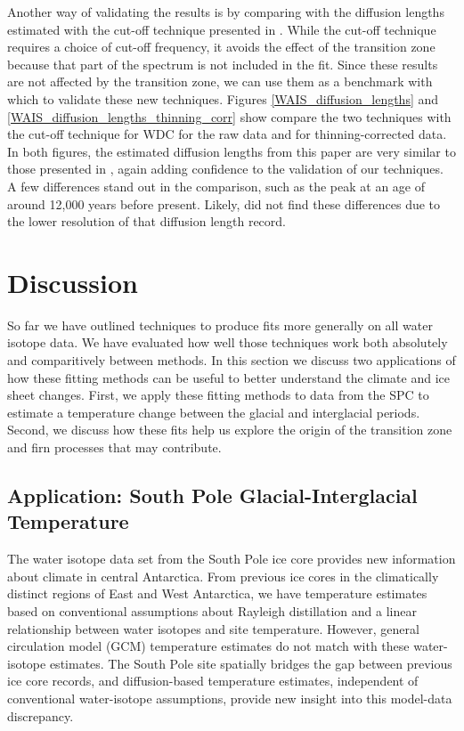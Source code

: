 \documentclass[draft, jgrga]{AGUTeX}
\begin{document}
\begin{article}
Another way of validating the results is by comparing with the diffusion lengths estimated with the cut-off technique presented in \cite{Jones2017a}. While the cut-off technique requires a choice of cut-off frequency, it avoids the effect of the transition zone because that part of the spectrum is not included in the fit. Since these results are not affected by the transition zone, we can use them as a benchmark with which to validate these new techniques. Figures \ref{WAIS_diffusion_lengths} and \ref{WAIS_diffusion_lengths_thinning_corr} show compare the two techniques with the cut-off technique for WDC for the raw data and for thinning-corrected data. In both figures, the estimated diffusion lengths from this paper are very similar to those presented in \cite{Jones2017a}, again adding confidence to the validation of our techniques. A few differences stand out in the comparison, such as the peak at an age of around 12,000 years before present. Likely, \cite{Jones2017a} did not find these differences due
to the lower resolution of that diffusion length record.


\section{Discussion}

So far we have outlined techniques to produce fits more generally on all water isotope data. We have evaluated how well those techniques work both absolutely and comparitively between methods. In this section we discuss two applications of how these fitting methods can be useful to better understand the climate and ice sheet changes. First, we apply these fitting methods to data from the SPC to estimate a temperature change between the glacial and interglacial periods. Second, we discuss how these fits help us explore the origin of the transition zone and firn processes that may contribute.

\subsection{Application: South Pole Glacial-Interglacial Temperature}

The water isotope data set from the South Pole ice core provides new information about climate in central Antarctica. From previous ice cores in the climatically distinct regions of East and West Antarctica, we have temperature estimates based on conventional assumptions about Rayleigh distillation and a linear relationship between water isotopes and site temperature. However, general circulation model (GCM) temperature estimates do not match with these water-isotope estimates. The South Pole site spatially bridges the gap between previous ice core records, and diffusion-based temperature estimates, independent of conventional water-isotope assumptions, provide new insight into this model-data discrepancy.


\end{article}
\end{document}
